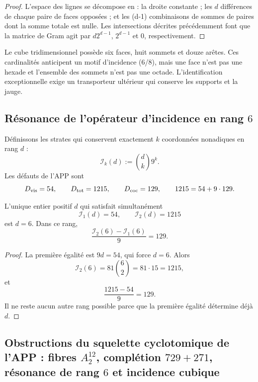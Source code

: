 \begin{proof}
L’espace des lignes se décompose en : la droite constante ; les \(d\)
différences de chaque paire de faces opposées ; et les (d-1) combinaisons de
sommes de paires dont la somme totale est nulle. Les intersections décrites précédemment
font que la matrice de Gram agit par \(d2^{d-1}\), \(2^{d-1}\) et \(0\),
respectivement.
\end{proof}

Le cube tridimensionnel possède six faces, huit sommets et douze arêtes. Ces
cardinalités anticipent un motif d’incidence (6/8), mais une face n’est pas
une hexade et l’ensemble des sommets n’est pas une octade. L’identification
exceptionnelle exige un transporteur ultérieur qui conserve les supports et la
jauge.

\subsection{Résonance de l’opérateur d’incidence en rang \(6\)}

Définissons les strates qui conservent exactement \(k\) coordonnées
nonadiques en rang \(d\) :
\[
 \mathcal I_k(d):=\binom dk9^k.
\]
Les défauts de l’APP sont
\[
 D_{\rm vis}=54,
 \qquad
 D_{\rm tot}=1215,
 \qquad
 D_{\rm coc}=129,
 \qquad
 1215=54+9\cdot129.
\]

\begin{theorem}
\label{p12-83-c1-s5:thm:resonancia-binomial-autonoma}
L’unique entier positif \(d\) qui satisfait simultanément
\[
 \mathcal I_1(d)=54,
 \qquad
 \mathcal I_2(d)=1215
\]
est \(d=6\). Dans ce rang,
\[
 \frac{\mathcal I_2(6)-\mathcal I_1(6)}9=129.
\]
\end{theorem}

\begin{proof}
La première égalité est \(9d=54\), qui force \(d=6\). Alors
\[
 \mathcal I_2(6)=81\binom62=81\cdot15=1215,
\]
et
\[
 \frac{1215-54}{9}=129.
\]
Il ne reste aucun autre rang possible parce que la première égalité détermine déjà \(d\).
\end{proof}

\subsection{Obstructions du squelette cyclotomique de l’APP : fibres \(A_2^{12}\), complétion \(729+271\), résonance de rang \(6\) et incidence cubique}

